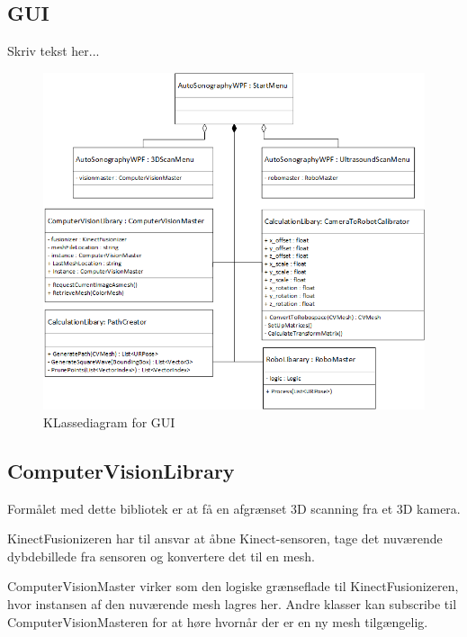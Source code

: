 \subsection{GUI}
Skriv tekst her...

\begin{figure}[H]
    \centering
    \includegraphics[width=1\textwidth]{figurer/d/Design/Class/uml_class_gui}
    \caption{KLassediagram for GUI}
    \label{class_gui}
\end{figure}
\newpage
\subsection{ComputerVisionLibrary}
Formålet med dette bibliotek er at få en afgrænset 3D scanning fra et 3D kamera.

KinectFusionizeren har til ansvar at åbne Kinect-sensoren, tage det nuværende dybdebillede fra sensoren og konvertere det til en mesh.

ComputerVisionMaster virker som den logiske grænseflade til KinectFusionizeren, hvor instansen af den nuværende mesh lagres her. Andre klasser kan subscribe til ComputerVisionMasteren for at høre hvornår der er en ny mesh tilgængelig.

